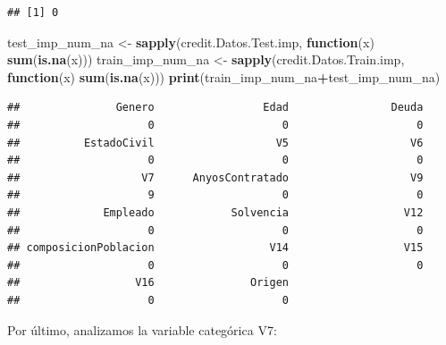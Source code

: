 \documentclass[
]{article}
\newenvironment{Shaded}{\begin{snugshade}}{\end{snugshade}}
\newcommand{\AttributeTok}[1]{\textcolor[rgb]{0.13,0.29,0.53}{#1}}
\newcommand{\ControlFlowTok}[1]{\textcolor[rgb]{0.13,0.29,0.53}{\textbf{#1}}}
\newcommand{\FunctionTok}[1]{\textcolor[rgb]{0.13,0.29,0.53}{\textbf{#1}}}
\newcommand{\NormalTok}[1]{#1}
\newcommand{\OtherTok}[1]{\textcolor[rgb]{0.56,0.35,0.01}{#1}}
\newcommand{\SpecialCharTok}[1]{\textcolor[rgb]{0.81,0.36,0.00}{\textbf{#1}}}
\newcommand{\StringTok}[1]{\textcolor[rgb]{0.31,0.60,0.02}{#1}}
\begin{document}
\begin{verbatim}
## [1] 0
\end{verbatim}

\begin{Shaded}
\begin{Highlighting}[]
\NormalTok{test\_imp\_num\_na }\OtherTok{\textless{}{-}} \FunctionTok{sapply}\NormalTok{(credit.Datos.Test.imp, }\ControlFlowTok{function}\NormalTok{(x) }\FunctionTok{sum}\NormalTok{(}\FunctionTok{is.na}\NormalTok{(x)))}
\NormalTok{train\_imp\_num\_na }\OtherTok{\textless{}{-}} \FunctionTok{sapply}\NormalTok{(credit.Datos.Train.imp, }\ControlFlowTok{function}\NormalTok{(x) }\FunctionTok{sum}\NormalTok{(}\FunctionTok{is.na}\NormalTok{(x)))}
\FunctionTok{print}\NormalTok{(train\_imp\_num\_na}\SpecialCharTok{+}\NormalTok{test\_imp\_num\_na)}
\end{Highlighting}
\end{Shaded}

\begin{verbatim}
##               Genero                 Edad                Deuda 
##                    0                    0                    0 
##          EstadoCivil                   V5                   V6 
##                    0                    0                    0 
##                   V7      AnyosContratado                   V9 
##                    9                    0                    0 
##             Empleado            Solvencia                  V12 
##                    0                    0                    0 
## composicionPoblacion                  V14                  V15 
##                    0                    0                    0 
##                  V16               Origen 
##                    0                    0
\end{verbatim}

Por último, analizamos la variable categórica V7:

\begin{Shaded}
\end{Shaded}
\end{document}
